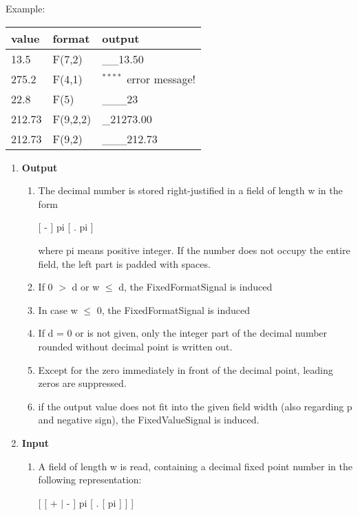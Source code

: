 \begin{removed}
Example:

\begin{tabular}{lll}
value  & format   & output \\ \hline
13.5   & F(7,2)   & \_\_13.50  \\
275.2  & F(4,1)   & $^{****}$ \x \x error message! \\
22.8   & F(5)     & \_\_\_23 \\
212.73 & F(9,2,2) & \_21273.00 \\
212.73 & F(9,2)   & \_\_\_212.73
\end{tabular}
\end{removed}

\begin{accepted}
\begin{enumerate}
\item {\bf Output}
\begin{enumerate}
\item The decimal number is stored right-justified in a field of length
w in the form

[ - ] pi [ . pi ]

where pi means positive integer. If the number does not occupy the
entire field, the left part is padded with spaces.
\item If 0 $>$ d or w $\leq$ d, the FixedFormatSignal is induced
\item In case w $\leq$ 0, the FixedFormatSignal is induced
\item If d = 0 or is not given, only the integer part of the decimal
number rounded without decimal point is written out.
\item Except for the zero immediately in front of the decimal point,
leading zeros are suppressed.
\item if the output value does not fit into the given field width 
   (also regarding p and negative sign), the FixedValueSignal is induced.
\end{enumerate}
\item {\bf Input}
\begin{enumerate}
\item A field of length w is read, containing a decimal fixed point
number in the following representation:

[ [ + $\mid$ - ] pi [ . [ pi ] ] ]


\end{enumerate}
\end{enumerate}
\end{accepted}
